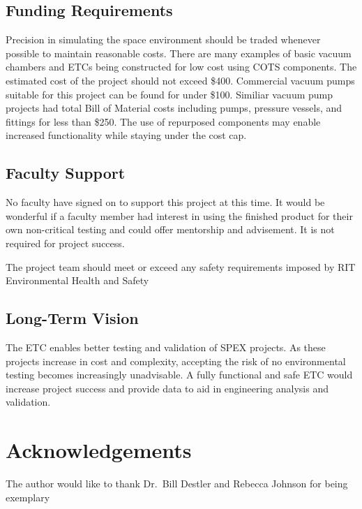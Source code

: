 \documentclass[conference]{IEEEtran} %
\begin{document}
\subsection{Funding Requirements}
  Precision in simulating the space environment should be traded whenever possible to maintain reasonable costs. There are many examples of basic vacuum chambers and ETCs being constructed for low cost using COTS components. The estimated cost of the project should not exceed \$400. Commercial vacuum pumps suitable for this project can be found for under \$100. Similiar vacuum pump projects had total Bill of Material costs including pumps, pressure vessels, and fittings for less than \$250. \cite{vacChamberExp} The use of repurposed components may enable increased functionality while staying under the cost cap.

\subsection{Faculty Support}
  No faculty have signed on to support this project at this time. It would be wonderful if a faculty member had interest in using the finished product for their own non-critical testing and could offer mentorship and advisement. It is not required for project success.

  The project team should meet or exceed any safety requirements imposed by RIT Environmental Health and Safety

\subsection{Long-Term Vision}
\label{sec:vision}
The ETC enables better testing and validation of SPEX projects. As these projects increase in cost and complexity, accepting the risk of no environmental testing becomes increasingly unadvisable. A fully functional and safe ETC would increase project success and provide data to aid in engineering analysis and validation.

\section*{Acknowledgements}
The author would like to thank Dr.~Bill Destler and Rebecca Johnson for being exemplary %




\end{document}
